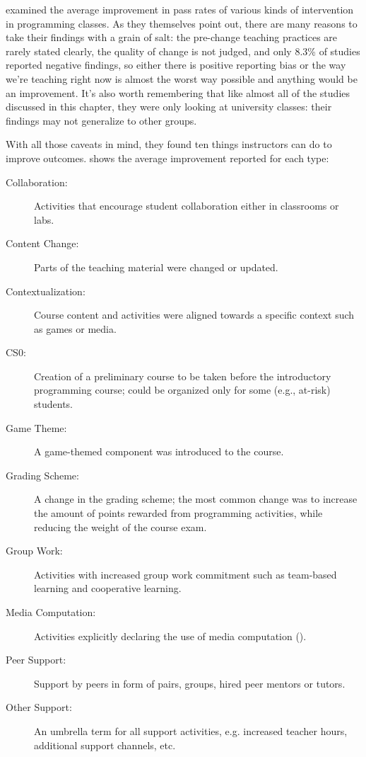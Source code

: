 \cite{Viha2014} examined the average improvement in pass rates of
various kinds of intervention in programming classes.  As they
themselves point out, there are many reasons to take their findings
with a grain of salt: the pre-change teaching practices are rarely
stated clearly, the quality of change is not judged, and only 8.3\% of
studies reported negative findings, so either there is positive
reporting bias or the way we're teaching right now is almost the worst
way possible and anything would be an improvement.  It's also worth
remembering that like almost all of the studies discussed in this
chapter, they were only looking at university classes: their findings
may not generalize to other groups.

With all those caveats in mind, they found ten things instructors can
do to improve outcomes.   shows the
average improvement reported for each type:

\begin{description}

\item[Collaboration:] %
  Activities that encourage student collaboration either in classrooms
  or labs.

\item[Content Change:] %
  Parts of the teaching material were changed or updated.

\item[Contextualization:] %
  Course content and activities were aligned towards a specific
  context such as games or media.

\item[CS0:] %
  Creation of a preliminary course to be taken before the introductory
  programming course; could be organized only for some (e.g., at-risk)
  students.

\item[Game Theme:] %
  A game-themed component was introduced to the course.

\item[Grading Scheme:] %
  A change in the grading scheme; the most common change was to
  increase the amount of points rewarded from programming activities,
  while reducing the weight of the course exam.

\item[Group Work:] %
  Activities with increased group work commitment such as team-based
  learning and cooperative learning.

\item[Media Computation:] %
  Activities explicitly declaring the use of media computation
  ().

\item[Peer Support:] %
  Support by peers in form of pairs, groups, hired peer mentors or
  tutors.

\item[Other Support:] %
  An umbrella term for all support activities, e.g. increased teacher
  hours, additional support channels, etc.

\end{description}

